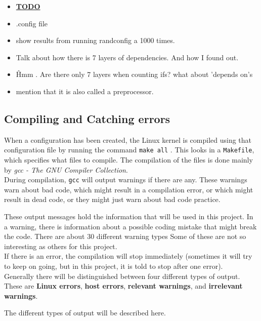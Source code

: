 \documentclass[a4paper,11pt]{report}
\newcommand{\textcode}[1]{
    \fboxsep=1pt
    \texttt{\colorbox{gray!20}{#1}}
}
\begin{document}
\begin{itemize}
    \item \underline{\textbf{TODO}}
    \item .config file
    \item show results from running randconfig a 1000 times.
    \item Talk about how there is 7 layers of dependencies. And how I found out.
    \item \^ Hmm . Are there only 7 layers when counting ifs? what about 
        'depends on's
    \item mention that it is also called a preprocessor.
\end{itemize}


\subsection{Compiling and Catching errors}

When a configuration has been created, the Linux kernel is compiled using 
that configuration file by running the command \textcode{make all}. This looks 
in a \texttt{Makefile}, which specifies what files to compile. The compilation 
of the files is done mainly by \emph{gcc - The GNU Compiler Collection}.
\\

During compilation, \texttt{gcc} will output warnings if there are any. These 
warnings warn about bad code, which might result in a compilation error, or 
which might result in dead code, or they might just warn about bad code 
practice.

These output messages hold the information that will be used in this project. 
In a warning, there is information about a possible coding mistake that might 
break the code. There are about 30 different warning types \cite{gccwarnings}
Some of these are not so interesting as others for this project.
\\

If there is an error, the compilation will stop immediately 
(sometimes it will try to keep on going, but in this project, it is told to 
stop after one error).
\\

Generally there will be distinguished between four different types of output. 
These are \textbf{Linux errors}, \textbf{host errors}, 
\textbf{relevant warnings}, and \textbf{irrelevant warnings}. 

The different types of output will be described here.
\end{document}
